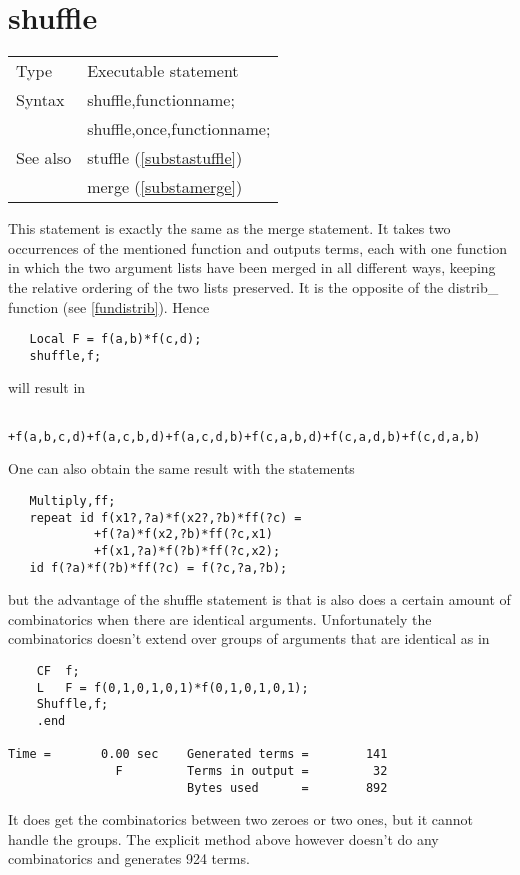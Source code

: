 %
\section{shuffle}
\label{substashuffle}

\noindent \begin{tabular}{ll}
Type & Executable statement\\
Syntax & shuffle,functionname; \\
       & shuffle,once,functionname;
\\ See also & stuffle (\ref{substastuffle}) \\
            & merge (\ref{substamerge})
\end{tabular} \vspace{4mm}

\noindent This statement is exactly the same as the merge 
statement. It takes two occurrences of the mentioned function and outputs 
terms, each with one function in which the two argument lists have been 
merged in all different ways, keeping the relative ordering of the two 
lists preserved. It is the opposite of the 
distrib\_ function (see 
\ref{fundistrib}). Hence
\begin{verbatim}
   Local F = f(a,b)*f(c,d);
   shuffle,f;
\end{verbatim}
will result in
\begin{verbatim}
      +f(a,b,c,d)+f(a,c,b,d)+f(a,c,d,b)+f(c,a,b,d)+f(c,a,d,b)+f(c,d,a,b)
\end{verbatim}
One can also obtain the same result with the statements
\begin{verbatim}
   Multiply,ff;
   repeat id f(x1?,?a)*f(x2?,?b)*ff(?c) =
            +f(?a)*f(x2,?b)*ff(?c,x1)
            +f(x1,?a)*f(?b)*ff(?c,x2);
   id f(?a)*f(?b)*ff(?c) = f(?c,?a,?b);
\end{verbatim}
but the advantage of the shuffle statement is that is also does a certain 
amount of combinatorics when there are identical arguments. Unfortunately 
the combinatorics doesn't extend over groups of arguments that are 
identical as in
\begin{verbatim}
    CF  f;
    L   F = f(0,1,0,1,0,1)*f(0,1,0,1,0,1);
    Shuffle,f;
    .end

Time =       0.00 sec    Generated terms =        141
               F         Terms in output =         32
                         Bytes used      =        892
\end{verbatim}
It does get the combinatorics between two zeroes or two ones, but it cannot 
handle the groups. The explicit method above however doesn't do any 
combinatorics and generates 924 terms.

